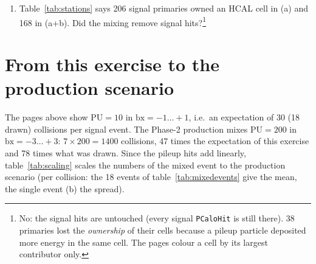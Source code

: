 \documentclass[11pt,a4paper]{article}
\newcommand{\code}[1]{\texttt{#1}}
\newcommand{\bx}{\ensuremath{\mathrm{bx}}}
\newcommand{\ns}{\,\mathrm{ns}}
\newcommand{\cm}{\,\mathrm{cm}}
\begin{document}
\begin{enumerate}
  separates the two, and which one separates the signal from event 1 of $\bx=-1$ at $z=0.03\cm$?\footnote{The
  tracker's vertex finder separates vertices $15\cm$ apart along $z$; the event of $\bx=-1$ sits at nearly
  the same $z$ but $25\ns$ earlier, so only the time (pixel readout window, MTD, HGCal timing) separates it.}
\item Table~\ref{tab:stations} says 206 signal primaries owned an HCAL cell in (a) and 168 in (a+b). Did the
  mixing remove signal hits?\footnote{No: the signal hits are untouched (every signal \code{PCaloHit} is still
  there). 38 primaries lost the \emph{ownership} of their cells because a pileup particle deposited more energy
  in the same cell. The pages colour a cell by its largest contributor only.}
\end{enumerate}

\FloatBarrier
\section{From this exercise to the production scenario}
\label{sec:scaling}

The pages above show $\mathrm{PU}=10$ in $\bx=-1\ldots+1$, i.e.\ an expectation of 30 (18 drawn) collisions
per signal event. The Phase-2 production mixes $\mathrm{PU}=200$ in $\bx=-3\ldots+3$: $7\times200=1400$
collisions, 47 times the expectation of this exercise and 78 times what was drawn. Since the pileup hits add
linearly, table~\ref{tab:scaling} scales the numbers of the mixed event to the production scenario (per
collision: the 18 events of table~\ref{tab:mixedevents} give the mean, the single event (b) the spread).
\end{document}
